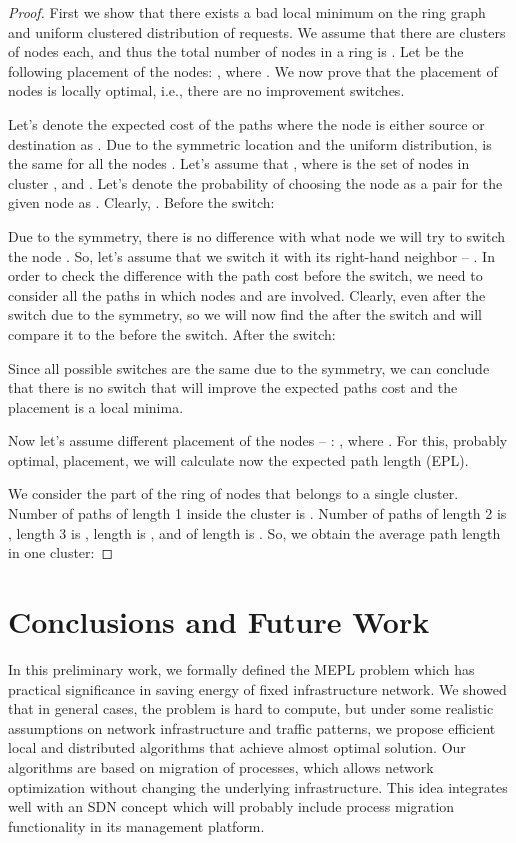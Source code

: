 \documentclass[conference]{IEEEtran}
\begin{document}
\begin{proof}
First we show that there exists a bad local minimum on the ring graph and uniform clustered distribution of requests. We assume that there are  clusters of  nodes each, and thus the total number of nodes in a ring is . Let  be the following placement of the nodes: , where .
We now prove that
the placement of nodes  is locally optimal, i.e., there are no improvement switches.

Let's denote the expected cost of the paths where the node  is either source or destination as . Due to the symmetric location and the uniform distribution,  is the same for all the nodes .  
Let's assume that , where  is the set of nodes in cluster , and . Let's denote the probability of choosing the node  as a pair for the given node  as . Clearly, . 
Before the switch:

Due to the symmetry, there is no difference with what node we will try to switch the node . So, let's assume that we switch it with its right-hand neighbor -- . In order to check the difference with the path cost before the switch, we need to consider all the paths in which nodes  and  are involved. Clearly, even after the switch  due to the symmetry, so we will now find the  after the switch and will compare it to the  before the switch.
After the switch:

Since all possible switches are the same due to the symmetry, we can conclude that there is no switch that will improve the expected paths cost and the placement  is a local minima.

Now let's assume different placement of the nodes -- :  , where .
For this, probably optimal, placement, we will calculate now the expected path length (EPL).

We consider the part of the ring of  nodes that belongs to a single cluster. Number of paths of length 1 inside the cluster is . Number of paths of length 2 is , length 3 is , length  is , and of length  is . So, we obtain the average path length in one cluster:


\end{proof}
 

\section{Conclusions and Future Work}\label{sec:conclusion}
In this preliminary work, we formally defined the MEPL problem which has practical significance in saving energy of fixed infrastructure network. We showed that in general cases, the problem is hard to compute, but under some realistic assumptions on network infrastructure and traffic patterns, we propose efficient local and distributed algorithms that achieve almost optimal solution. Our algorithms are based on migration of processes, which allows network optimization without changing the underlying infrastructure. This idea integrates well with an SDN concept which will probably include process migration functionality in its management platform.
\end{document}
